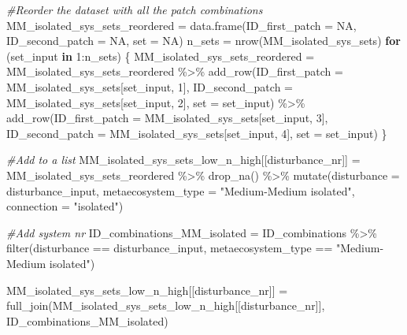 \documentclass[
]{article}
\newenvironment{Shaded}{\begin{snugshade}}{\end{snugshade}}
\newcommand{\AttributeTok}[1]{\textcolor[rgb]{0.77,0.63,0.00}{#1}}
\newcommand{\CommentTok}[1]{\textcolor[rgb]{0.56,0.35,0.01}{\textit{#1}}}
\newcommand{\ConstantTok}[1]{\textcolor[rgb]{0.00,0.00,0.00}{#1}}
\newcommand{\ControlFlowTok}[1]{\textcolor[rgb]{0.13,0.29,0.53}{\textbf{#1}}}
\newcommand{\DecValTok}[1]{\textcolor[rgb]{0.00,0.00,0.81}{#1}}
\newcommand{\FunctionTok}[1]{\textcolor[rgb]{0.00,0.00,0.00}{#1}}
\newcommand{\NormalTok}[1]{#1}
\newcommand{\OtherTok}[1]{\textcolor[rgb]{0.56,0.35,0.01}{#1}}
\newcommand{\SpecialCharTok}[1]{\textcolor[rgb]{0.00,0.00,0.00}{#1}}
\newcommand{\StringTok}[1]{\textcolor[rgb]{0.31,0.60,0.02}{#1}}
\begin{document}
\begin{Shaded}
\begin{Highlighting}[]
  \CommentTok{\#Reorder the dataset with all the patch combinations }
\NormalTok{  MM\_isolated\_sys\_sets\_reordered }\OtherTok{=} \FunctionTok{data.frame}\NormalTok{(}\AttributeTok{ID\_first\_patch =} \ConstantTok{NA}\NormalTok{,}
                                              \AttributeTok{ID\_second\_patch =} \ConstantTok{NA}\NormalTok{,}
                                              \AttributeTok{set =} \ConstantTok{NA}\NormalTok{)}
\NormalTok{  n\_sets }\OtherTok{=} \FunctionTok{nrow}\NormalTok{(MM\_isolated\_sys\_sets)}
  \ControlFlowTok{for}\NormalTok{ (set\_input }\ControlFlowTok{in} \DecValTok{1}\SpecialCharTok{:}\NormalTok{n\_sets) \{}
\NormalTok{    MM\_isolated\_sys\_sets\_reordered }\OtherTok{=}\NormalTok{ MM\_isolated\_sys\_sets\_reordered }\SpecialCharTok{\%\textgreater{}\%}
      \FunctionTok{add\_row}\NormalTok{(}\AttributeTok{ID\_first\_patch =}\NormalTok{ MM\_isolated\_sys\_sets[set\_input, }\DecValTok{1}\NormalTok{],}
              \AttributeTok{ID\_second\_patch =}\NormalTok{ MM\_isolated\_sys\_sets[set\_input, }\DecValTok{2}\NormalTok{],}
              \AttributeTok{set =}\NormalTok{ set\_input) }\SpecialCharTok{\%\textgreater{}\%}
      \FunctionTok{add\_row}\NormalTok{(}\AttributeTok{ID\_first\_patch =}\NormalTok{ MM\_isolated\_sys\_sets[set\_input, }\DecValTok{3}\NormalTok{],}
              \AttributeTok{ID\_second\_patch =}\NormalTok{ MM\_isolated\_sys\_sets[set\_input, }\DecValTok{4}\NormalTok{],}
              \AttributeTok{set =}\NormalTok{ set\_input)}
\NormalTok{  \}}
  
  \CommentTok{\#Add to a list}
\NormalTok{  MM\_isolated\_sys\_sets\_low\_n\_high[[disturbance\_nr]] }\OtherTok{=}\NormalTok{ MM\_isolated\_sys\_sets\_reordered }\SpecialCharTok{\%\textgreater{}\%}
    \FunctionTok{drop\_na}\NormalTok{() }\SpecialCharTok{\%\textgreater{}\%}
    \FunctionTok{mutate}\NormalTok{(}\AttributeTok{disturbance =}\NormalTok{ disturbance\_input,}
           \AttributeTok{metaecosystem\_type =} \StringTok{"Medium{-}Medium isolated"}\NormalTok{,}
           \AttributeTok{connection =} \StringTok{"isolated"}\NormalTok{)}
  
  \CommentTok{\#Add system nr }
\NormalTok{  ID\_combinations\_MM\_isolated }\OtherTok{=}\NormalTok{ ID\_combinations }\SpecialCharTok{\%\textgreater{}\%}
    \FunctionTok{filter}\NormalTok{(disturbance }\SpecialCharTok{==}\NormalTok{ disturbance\_input,}
\NormalTok{           metaecosystem\_type }\SpecialCharTok{==} \StringTok{"Medium{-}Medium isolated"}\NormalTok{)}
  
\NormalTok{  MM\_isolated\_sys\_sets\_low\_n\_high[[disturbance\_nr]] }\OtherTok{=} \FunctionTok{full\_join}\NormalTok{(MM\_isolated\_sys\_sets\_low\_n\_high[[disturbance\_nr]], }
\NormalTok{                                                                ID\_combinations\_MM\_isolated)}
  

\end{Highlighting}
\end{Shaded}
\end{document}
